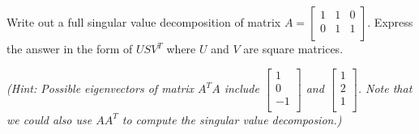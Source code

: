 



Write out a full singular value decomposition of matrix $A = \begin{bmatrix}
    1 & 1 & 0 \\
    0 & 1 & 1 \\
  \end{bmatrix}$. Express the answer in the form of $USV^{T}$ where $U$ and $V$ are square matrices. 

\textit{(Hint: 
Possible eigenvectors of matrix $A^{T}A$ include $\begin{bmatrix}
    1 \\ 0 \\ -1 \\
  \end{bmatrix}$ and $\begin{bmatrix}
    1 \\ 2 \\ 1 \\
  \end{bmatrix}$.  Note that we could also use $AA^{T}$ to compute the singular value decomposion.)}

